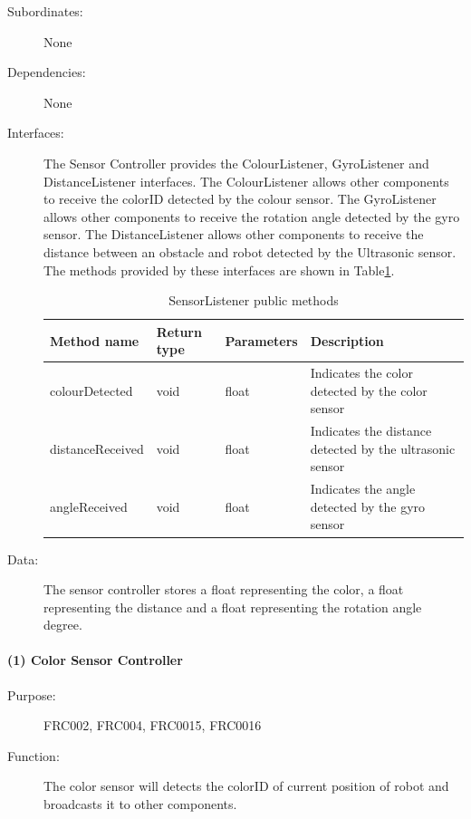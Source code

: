 \documentclass[12pt]{article}
\begin{document}
\begin{description}
\item[{Subordinates: }] None
\item[{Dependencies: }] None
\item[{Interfaces: }] The Sensor Controller provides the ColourListener, GyroListener and DistanceListener interfaces. The ColourListener allows other components to receive the colorID detected by the colour sensor. The GyroListener allows other components to receive the rotation angle detected by the gyro sensor. The DistanceListener allows other components to receive the distance between an obstacle and robot detected by the Ultrasonic sensor. The methods provided by these interfaces are shown in Table\ref{table:sensorlistener}.

\begin{table}
\begin{tabular}{ | p{} | p{} |p{}|p{}|}
\hline
\textbf{Method name} & \textbf{Return type} & \textbf{Parameters} & \textbf{Description} \\
\hline
colourDetected & void & float & Indicates the color detected by the color sensor \\
\hline
distanceReceived & void & float & Indicates the distance detected by the ultrasonic sensor \\
\hline
angleReceived & void & float & Indicates the angle detected by the gyro sensor \\
\hline
\end{tabular}
\caption{SensorListener public methods}
\label{table:sensorlistener}
\end{table}

\item[{Data: }] The sensor controller stores a float representing the color, a float representing the distance and a float representing the rotation angle degree.
\end{description}

\paragraph{(1) Color Sensor Controller}
\begin{description}
\item [{Purpose:}] FRC002, FRC004, FRC0015, FRC0016
\item [{Function: }] The color sensor will detects the colorID of current position of robot and broadcasts it to other components.
\end{description}
\end{document}
